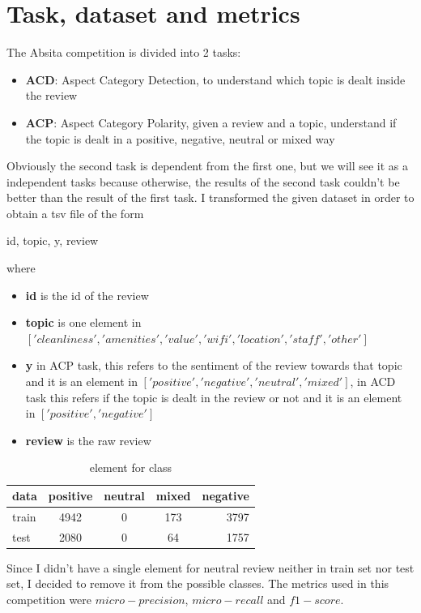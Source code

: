 \documentclass{article}
\begin{document}
    \section{Task, dataset and metrics}\label{sec:s1}
        The Absita competition is divided into 2 tasks:
        \begin{itemize}
            \item \textbf{ACD}: Aspect Category Detection, to understand which topic is dealt inside the review
            \item \textbf{ACP}: Aspect Category Polarity, given a review and a topic, understand if the topic is dealt in a positive, negative, neutral or mixed way
        \end{itemize}
        Obviously the second task is dependent from the first one, but we will see it as a independent tasks
        because otherwise, the results of the second task couldn't be better than the result of the first task.
        I transformed the given dataset in order to obtain a tsv file of the form
        \\\centerline{id, topic, y, review}
        where
        \begin{itemize}
            \item \textbf{id} is the id of the review
            \item \textbf{topic} is one element in $['cleanliness', 'amenities', 'value', 'wifi', 'location', 'staff', 'other']$
            \item \textbf{y} in ACP task, this refers to the sentiment of the review towards that topic and it is an element in $['positive', 'negative', 'neutral', 'mixed']$, in ACD task this refers if the topic is dealt in the review or not and it is an element in $['positive', 'negative']$
            \item \textbf{review} is the raw review
        \end{itemize}
        \begin{table}[h!]
            \begin{center}
                \caption{element for class}
                \label{tab:table1}
                \begin{tabular}{l|c|c|c|r}
                    \textbf{data} & \textbf{positive} & \textbf{neutral} & \textbf{mixed} & \textbf{negative}\\
                    \hline
                        train & 4942 & 0 & 173 & 3797\\
                        test & 2080 & 0 & 64 & 1757\\
                \end{tabular}
            \end{center}
        \end{table}
        Since I didn't have a single element for neutral review neither in train set nor test set, I decided to remove it from the possible classes.
        The metrics used in this competition were $micro-precision$, $micro-recall$ and $f1-score$.
\end{document}
